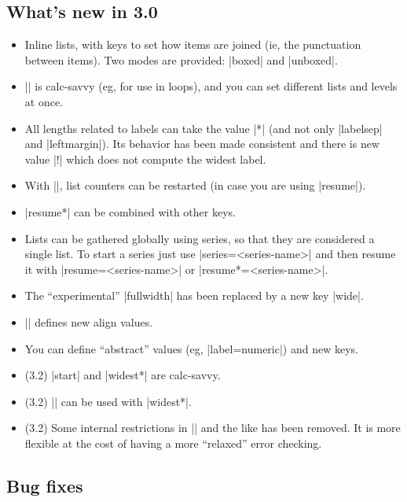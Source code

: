 \documentclass[a4paper]{ltxguide}
\begin{document}
\begin{enumerate}[leftmargin=*]
\begin{enumerate}[leftmargin=\parindent]
\begin{enumerate}[labelindent=\parindent,|\allowbreak
| leftmargin=*,|\allowbreak| label=\Roman*.,|\allowbreak
| widest=III,|\allowbreak| align=left]
\begin{enumerate}[label=\fbox{\arabic*}]
\subsection{What's new in 3.0}

\begin{itemize}
\item Inline lists, with keys to set how items are joined (ie, the
punctuation between items).  Two modes are provided: |boxed|  and
|unboxed|.

\item |\setlist| is \textsf{calc}-savvy (eg, for use in loops),
and you can set different lists and levels at once.  \item All lengths
related to labels can take the value |*| (and not only
|labelsep| and |leftmargin|).  Its behavior has been made
consistent and there is new value |!| which does not compute the
widest label.

\item With ||, list counters can be restarted (in
case you are using |resume|).

\item |resume*| can be combined with other keys.

\item Lists can be gathered globally using series, so that they are
considered a single list. To start a series just use
|series=<series-name>| and then resume it with |resume=<series-name>|
or |resume*=<series-name>|.

\item The ``experimental'' |fullwidth| has been replaced by a new key
|wide|.

\item|\SetLabelAlign| defines new align values.

\item You can define ``abstract'' values (eg, |label=numeric|) and
new keys.
\end{itemize}

\begin{itemize}
\item (3.2) |start| and |widest*| are \textsf{calc}-savvy.
\item (3.2) |\value| can be used with |widest*|.
\item (3.2) Some internal restrictions in |\arabic| and the like
has been removed.  It is more flexible at the cost of having a more
``relaxed'' error checking.
\end{itemize}
\subsection{Bug fixes}


\end{enumerate}
\end{enumerate}
\end{enumerate}
\end{enumerate}
\end{document}
